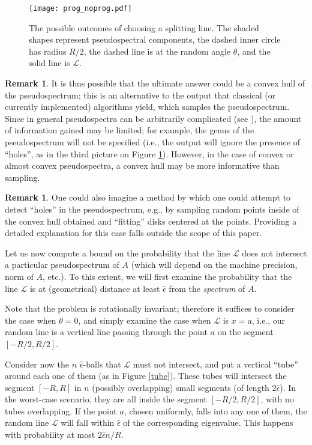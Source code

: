 \documentclass{article}
\theoremstyle{definition}
\newtheorem{remark}[theorem]{Remark}
\begin{document}
\begin{figure}[ht!] 
\begin{center}
\texttt{[image: prog\_noprog.pdf]}
\caption{The possible outcomes of choosing a splitting line. The shaded shapes represent pseudospectral components, the dashed inner circle has radius $R/2$, the dashed line is at the random angle $\theta$, and the solid line is $\mathcal{L}$.} 
\label{pr_nopr}
\end{center}
\end{figure}

\begin{remark} It is thus possible that the ultimate answer could be a convex hull of the pseudospectrum; this is an alternative to the output that classical (or currently implemented) algorithms yield, which samples the pseudospectrum. Since in general pseudospectra can be arbitrarily complicated (see \cite{trefethenreichel}), the amount of information gained may be limited; for example, the genus of the pseudospectrum will not be specified (i.e., the output will ignore the presence of ``holes'', as in the third picture on Figure \ref{pr_nopr}). However, in the case of convex or almost convex pseudospectra, a convex hull may be more informative than sampling.
\end{remark}
\begin{remark}
One could also imagine a method by which one could attempt to detect ``holes'' in the pseudospectrum, e.g., by sampling random points inside of the convex hull obtained and ``fitting'' disks centered at the points. Providing a detailed explanation for this case falls outside the scope of this paper. 
\end{remark}

Let us now compute a bound on the probability that the line $\mathcal{L}$ does not intersect a particular pseudospectrum of $A$ (which will depend on the machine precision, norm of $A$, etc.). To this extent, we will first examine the probability that the line $\mathcal{L}$ is at (geometrical) distance at least $\hat{\epsilon}$ from the \emph{spectrum} of $A$. 

Note that the problem is rotationally invariant; therefore it suffices to consider the case when $\theta = 0$, and simply examine the case when $\mathcal{L}$ is $x = a$, i.e., our random line is a vertical line passing through the point $a$ on the segment $[-R/2, R/2]$. 

Consider now the $n$ $\hat{\epsilon}$-balls that $\mathcal{L}$ must not intersect, and put a vertical ``tube'' around each one of them (as in Figure \ref{tube}). These tubes will intersect the segment $[-R,R]$ in $n$ (possibly overlapping) small segments (of length $2 \hat{\epsilon}$). In the worst-case scenario, they are all inside the segment $[-R/2, R/2]$, with no tubes overlapping. If the point $a$, chosen uniformly, falls into any one of them, the random line $\mathcal{L}$ will fall within $\hat{\epsilon}$ of the corresponding eigenvalue. This happens with probability at most $2 \hat{\epsilon} n/R$. 
\end{document}
